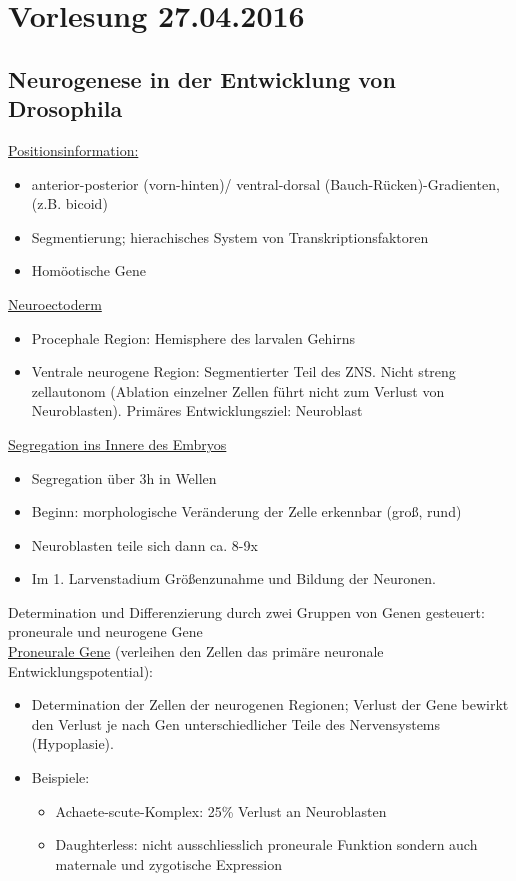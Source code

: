 \section{Vorlesung 27.04.2016}

\subsection{Neurogenese in der Entwicklung von Drosophila}
\underline{Positionsinformation:}
\begin{itemize}
	\item anterior-posterior (vorn-hinten)/ ventral-dorsal (Bauch-Rücken)-Gradienten, (z.B. bicoid)
	\item Segmentierung; hierachisches System von Transkriptionsfaktoren
	\item Homöotische Gene
\end{itemize}

\underline{Neuroectoderm}
\begin{itemize}
	\item Procephale Region: Hemisphere des larvalen Gehirns
	\item Ventrale neurogene Region: Segmentierter Teil des ZNS. Nicht streng zellautonom (Ablation einzelner Zellen führt nicht zum Verlust von Neuroblasten). Primäres Entwicklungsziel: Neuroblast
\end{itemize}

\underline{Segregation ins Innere des Embryos}
\begin{itemize}
	\item Segregation über 3h in Wellen
	\item Beginn: morphologische Veränderung der Zelle erkennbar (groß, rund)
	\item Neuroblasten teile sich dann ca. 8-9x
	\item Im 1. Larvenstadium Größenzunahme und Bildung der Neuronen.
\end{itemize}

Determination und Differenzierung durch zwei Gruppen von Genen gesteuert: proneurale und neurogene Gene\\

\underline{Proneurale Gene} (verleihen den Zellen das primäre neuronale Entwicklungspotential):
\begin{itemize}
	\item Determination der Zellen der neurogenen Regionen; Verlust der Gene bewirkt den Verlust je nach Gen unterschiedlicher Teile des Nervensystems (Hypoplasie).
	\item Beispiele:
		\begin{itemize}
			\item Achaete-scute-Komplex: 25\% Verlust an Neuroblasten
			\item Daughterless: nicht ausschliesslich proneurale Funktion sondern auch maternale und zygotische Expression
		\end{itemize}
\end{itemize}

